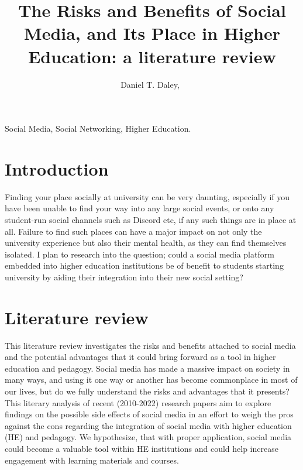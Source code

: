 \documentclass[lettersize,journal]{IEEEtran}
\begin{document}
\title{The Risks and Benefits of Social Media, and Its Place in Higher Education: a literature review}

\author{Daniel T. Daley,~}




\maketitle
\begin{abstract}
\end{abstract}

\begin{IEEEkeywords}
Social Media, Social Networking, Higher Education.
\end{IEEEkeywords}

\section{Introduction}
    Finding your place socially at university can be very daunting,
    especially if you have been unable to find your way into any large social events, or onto any student-run social channels such as Discord etc, if any such things are in place at all. Failure to find such places can have a major impact on not only the university experience but also their mental health, as they can find themselves isolated. I
    plan to research into the question; could a social media platform embedded
    into higher education institutions be of benefit to students starting
    university by aiding their integration into their new social setting?
\section{Literature review}
    This literature review investigates the risks and benefits attached to
    social media and the potential advantages that it could bring forward as a
    tool in higher education and pedagogy. Social media has made a massive
    impact on society in many ways, and using it one way or another has become
    commonplace in most of our lives, but do we fully understand the risks and
    advantages that it presents? This literary analysis of recent (2010-2022)
    research papers aim to explore findings on the possible side effects of
    social media in an effort to weigh the pros against the cons regarding
    the integration of social media with higher education (HE) and pedagogy. We
    hypothesize, that with proper application, social media could become a valuable
    tool within HE institutions and could help increase engagement with learning
    materials and courses.
\end{document}
